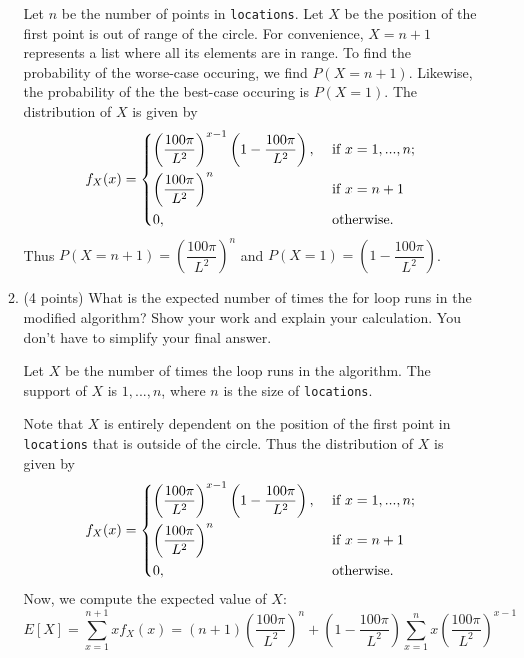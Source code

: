 \documentclass{assignment-263}
\begin{document}
\begin{enumerate}
\begin{enumerate}
    Let \(n\) be the number of points in \verb|locations|. Let \(X\) be the position of the first point is out of range of the circle. For convenience, \(X = n + 1\) represents a list where all its elements are in range. To find the probability of the worse-case occuring, we find \(P(X = n + 1)\). Likewise, the probability of the the best-case occuring is \(P(X = 1)\). The distribution of \(X\) is given by
    \[
      f_X(x) = \begin{dcases}
        \left( \dfrac{100\pi}{L^2} \right)^{x-1} \left( 1 - \dfrac{100\pi}{L^2} \right), &\text{ if } x = 1, ..., n ;\\
        \left( \dfrac{100\pi}{L^2} \right)^{n} &\text{ if } x = n + 1 \\
        0, &\text{ otherwise} .
      \end{dcases}
    \]
    Thus \(P(X = n + 1) = \left( \dfrac{100\pi}{L^2} \right)^{n}\) and \(P(X = 1) = \left( 1 - \dfrac{100\pi}{L^2} \right)\).


    \item (4 points) What is the expected number of times the for loop runs in the modified algorithm? Show your work and explain your calculation. You don't have to simplify your final answer.
    
    Let \(X\) be the number of times the loop runs in the algorithm. The support of \(X\) is \(1, ..., n\), where \(n\) is the size of \verb|locations|.

    Note that \(X\) is entirely dependent on the position of the first point in \verb|locations| that is outside of the circle. Thus the distribution of \(X\) is given by
    \[
      f_X(x) = \begin{dcases}
        \left( \dfrac{100\pi}{L^2} \right)^{x-1} \left( 1 - \dfrac{100\pi}{L^2} \right), &\text{ if } x = 1, ..., n ;\\
        \left( \dfrac{100\pi}{L^2} \right)^{n} &\text{ if } x = n + 1 \\
        0, &\text{ otherwise} .
      \end{dcases}
    \]
    Now, we compute the expected value of \(X\):
    \[
      E[X] = \sum_{x=1}^{n+1} x f_X(x) = (n + 1)\left( \dfrac{100\pi}{L^2} \right)^{n} + \left( 1 - \dfrac{100\pi}{L^2} \right)\sum_{x=1}^{n} x\left( \dfrac{100\pi}{L^2} \right)^{x - 1}
    \]
\end{enumerate}

\end{enumerate}

\bigskip
\end{document}
